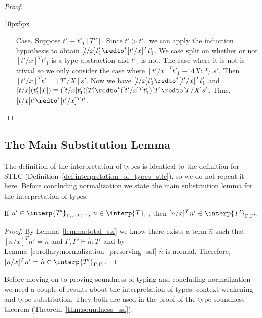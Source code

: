 \begin{proof}
\begin{changemargin}{10px}{5px}
\begin{itemize}
\item[Case.] Suppose $t' \equiv t'_1[T'']$.
  Since $t' > t'_1$ we can apply the induction hypothesis to
  obtain $[t/x] t'_1 \redto^* [t'/x]^T t'_1$.  We case split on whether or not $[t'/x]^T t'_1$ is
  a type abstraction and $t'_1$ is not.  The case where it is not is trivial so we only consider
  the case where $[t'/x]^T t'_1 \equiv \Lambda X:*_l.s'$.  Then 
  $[t'/x]^T t'  = [T'/X]s'$.  Now we have $[t/x] t'_1 \redto^* [t'/x]^T t'_1$ and
  $[t/x](t'_1[T]) \equiv ([t/x]t'_1)[T] \redto^* ([t'/x]^T t'_1)[T] \redto [T/X]s'$.  Thus,
  $[t/x]t' \redto^* [t'/x]^T t'$.  
\end{itemize}
\end{changemargin}
\end{proof}

\subsection{The Main Substitution Lemma}
\label{subsec:substitution_for_the_interpretation_of_types_ssf}
The definition of the interpretation of types is identical to the
definition for STLC (Definition~\ref{def:interpretation_of_types_stlc}),
so we do not repeat it here.  Before concluding normalization we state
the main substitution lemma for the interpretation of types.
\begin{lemma}
  If $n' \in \interp{T'}_{\Gamma,x:T,\Gamma'}$, $n \in \interp{T}_\Gamma$, then 
  $[n/x]^T n' \in \interp{T'}_{\Gamma,\Gamma'}$.
  
  \label{lemma:interpretation_of_types_closed_substitution_ssf}
\end{lemma}
\begin{proof}
  By Lemma~\ref{lemma:total_ssf} we know there exists a term $\hat{n}$ 
  such that $[n/x]^T n' = \hat{n}$ and $\Gamma,\Gamma' \vdash \hat{n}:T'$ and by 
  Lemma~\ref{corollary:normalization_preserving_ssf} $\hat{n}$ is normal.  Therefore,
  $[n/x]^T n' = \hat{n} \in \interp{T'}_{\Gamma,\Gamma'}$.
\end{proof}

Before moving on to proving soundness of typing and concluding
normalization we need a couple of results about the interpretation of
types: context weakening and type substitution.  They both are used in
the proof of the type soundness theorem
(Theorem~\ref{thm:soundness_ssf}).

